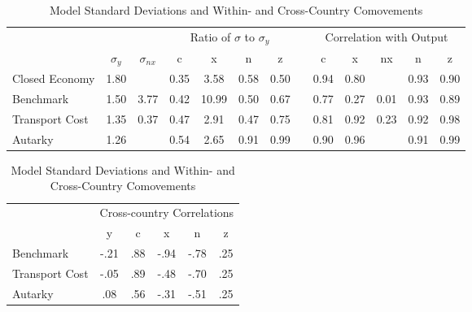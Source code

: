 \begin{table}[ht]
\centering
\begin{subtable}{\textwidth}
  \centering
  \caption{Standard Deviations and Within-Country Comovements}
  \begin{adjustbox}{max width=\textwidth}
  \begin{tabular}{lcccccccccccc}
  \toprule
          &       &       & \multicolumn{4}{c}{Ratio of $\sigma$ to  $\sigma_y$} & \multicolumn{1}{c}{} & \multicolumn{5}{c}{Correlation with Output} \\
\cmidrule(lr){4-7}\cmidrule(lr){9-13}          & $\sigma_y$     & $\sigma_{nx}$    & c     & x     & n     & z     &       & \multicolumn{1}{c}{c} & \multicolumn{1}{c}{x} & \multicolumn{1}{c}{nx} & \multicolumn{1}{c}{n} & \multicolumn{1}{c}{z}\\
\midrule
    Closed Economy & 1.80  &   & 0.35  & 3.58  & 0.58  & 0.50  &       & 0.94  & 0.80  &       & 0.93  & 0.90 \\
    Benchmark & 1.50  & 3.77  & 0.42  & 10.99 & 0.50  & 0.67  &       & 0.77  & 0.27  & 0.01  & 0.93  & 0.89 \\
    Transport Cost & 1.35  & 0.37  & 0.47  & 2.91  & 0.47  & 0.75  &       & 0.81  & 0.92  & 0.23  & 0.92  & 0.98 \\
    Autarky & 1.26  &       & 0.54  & 2.65  & 0.91  & 0.99  &       & 0.90  & 0.96  &       & 0.91  & 0.99 \\
  \bottomrule
    \end{tabular}
  \end{adjustbox}
\end{subtable}

\medskip

\begin{subtable}{\textwidth}
  \centering
  \caption{Comovements between the Two Countries}
    \begin{tabular}{lccccc}
    \toprule
          & \multicolumn{5}{c}{Cross-country Correlations} \\
      \cmidrule(lr){2-6}
            & y     & c     & x     & n     & z \\
    \midrule
    Benchmark & -.21 & .88  & -.94 & -.78 & .25 \\
    Transport Cost & -.05 & .89  & -.48 & -.70  & .25 \\
    Autarky & .08  & .56  & -.31 & -.51 & .25 \\
  \bottomrule
    \end{tabular}
\end{subtable}
\caption{Model Standard Deviations and Within- and Cross-Country Comovements}
\label{tab:modelresult}
\end{table}


